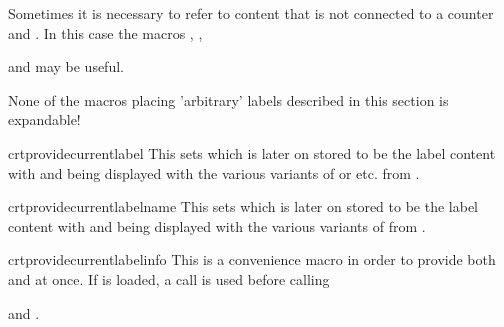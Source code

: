 \documentclass[12pt,a4paper,oneside]{article}
\makeatletter
\newcommand{\chdocextractversion}[1]{%
  \@nameuse{#1}%
}
\makeatother
\begin{document}
Sometimes it is necessary to refer to content that is not connected to a counter and . In this case the macros , , 

 and  may be useful.

\begin{marker}
  None of the macros placing 'arbitrary' labels described in this section is expandable! 
\end{marker}

\begin{docCommand}[doc new={\chdocextractversion{crossreftoolsversion0.4}}]{crtprovidecurrentlabel}{}
This sets  which is later on stored to be the label content with  and being displayed with the various variants of  or  etc. from . 
\end{docCommand}

\begin{docCommand}[doc new={\chdocextractversion{crossreftoolsversion0.4}}]{crtprovidecurrentlabelname}{}
This sets  which is later on stored to be the label content with  and being displayed with the various variants of  from . 
\end{docCommand}

\begin{docCommand}[doc new={\chdocextractversion{crossreftoolsversion0.4}}]{crtprovidecurrentlabelinfo}{}
This is a convenience macro in order to provide both  and  at once. If  is loaded, a  call is used before calling

 and .
\end{docCommand}
\end{document}
